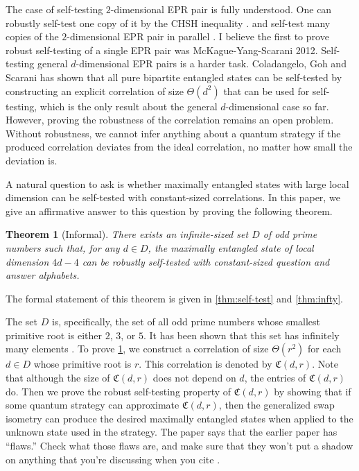 \documentclass[11pt,letterpaper]{article}
\newcommand{\1}{\mathbb{1}}
\newcommand{\fC}{\mathfrak{C}}
\def\carl#1{{\color{blue} #1}}
\newtheorem{theorem}{Theorem}[section]
\theoremstyle{definition}
\begin{document}
The case of self-testing $2$-dimensional EPR pair is fully understood. One can robustly self-test
one copy of it by the CHSH inequality \cite{bamps2015}. and self-test many copies of the $2$-dimensional EPR
pair in parallel \cite{mckague2016, coladan2016parallel, lowdegree}. 
\carl{I believe the first to prove robust self-testing of a single EPR pair was McKague-Yang-Scarani 2012.}
Self-testing general $d$-dimensional EPR pairs is a harder task.
Coladangelo, Goh and Scarani has shown that all pure bipartite entangled states can be self-tested \cite{coladan2017all}
by constructing an explicit correlation of size $\Theta(d^2)$ that can be used for self-testing,
which is the only result about the general $d$-dimensional case so far.
However, proving the robustness of the correlation remains an open problem. 
Without robustness, we cannot infer anything about a quantum strategy if
the produced correlation deviates from the ideal correlation, no matter how small the 
deviation is. 
 
A natural question to ask is whether maximally entangled states with large local dimension
can be self-tested with constant-sized correlations. 
In this paper, we give an affirmative answer to this question by proving the following theorem.
\begin{theorem}[Informal]
\label{thm:inf}
	There exists an infinite-sized set $D$ of odd prime numbers such that, for any $d \in D$, 
	the maximally entangled state of local dimension $4d-4$ can be robustly self-tested 
	with constant-sized question and answer alphabets.
\end{theorem}
The formal statement of this theorem is given in \cref{thm:self-test} and \cref{thm:infty}.

The set $D$ is, \carl{
specifically, the set of all 
odd prime numbers whose smallest primitive root is either $2$, $3$,
or $5$}.  It has been shown that \carl{this set} has infinitely many elements \cite{murty1988}.
To prove \cref{thm:inf}, we construct a correlation of size $\Theta(r^2)$ for each $d \in D$ whose primitive
root is $r$. This correlation is denoted by $\fC(d,r)$.
Note that although the size of $\fC(d,r)$ does not depend on $d$, the entries of $\fC(d,r)$ do.
Then we prove the robust self-testing property of $\fC(d,r)$ by showing 
that if some quantum strategy can approximate $\fC(d,r)$, then
the generalized swap isometry \cite{yang2013}
can produce the desired maximally entangled states when applied to the unknown state used in the strategy.
\carl{The paper \cite{bamps2015} says that the earlier paper \cite{yang2013} has ``flaws.'' Check what those flaws are, and make sure that they won't put a shadow on anything that you're discussing when you cite \cite{yang2013}.} 
\end{document}
